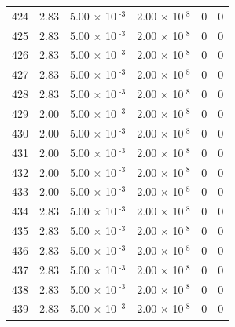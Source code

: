 \documentclass[a4paper,11pt]{article}
\begin{document}
\begin{center}
\begin{longtable}{|R{1.5cm}|R{2.4cm}|R{2.4cm}|R{2.4cm}|R{2.4cm}|R{2.4cm}|}
  424 &   2.83  &         5.00 $\times$ 10$^{\text{          -3}}$  &         2.00 $\times$ 10$^{\text{           8}}$  & 0  & 0 \\
  425 &   2.83  &         5.00 $\times$ 10$^{\text{          -3}}$  &         2.00 $\times$ 10$^{\text{           8}}$  & 0  & 0 \\
  426 &   2.83  &         5.00 $\times$ 10$^{\text{          -3}}$  &         2.00 $\times$ 10$^{\text{           8}}$  & 0  & 0 \\
  427 &   2.83  &         5.00 $\times$ 10$^{\text{          -3}}$  &         2.00 $\times$ 10$^{\text{           8}}$  & 0  & 0 \\
  428 &   2.83  &         5.00 $\times$ 10$^{\text{          -3}}$  &         2.00 $\times$ 10$^{\text{           8}}$  & 0  & 0 \\
  429 &   2.00  &         5.00 $\times$ 10$^{\text{          -3}}$  &         2.00 $\times$ 10$^{\text{           8}}$  & 0  & 0 \\
  430 &   2.00  &         5.00 $\times$ 10$^{\text{          -3}}$  &         2.00 $\times$ 10$^{\text{           8}}$  & 0  & 0 \\
  431 &   2.00  &         5.00 $\times$ 10$^{\text{          -3}}$  &         2.00 $\times$ 10$^{\text{           8}}$  & 0  & 0 \\
  432 &   2.00  &         5.00 $\times$ 10$^{\text{          -3}}$  &         2.00 $\times$ 10$^{\text{           8}}$  & 0  & 0 \\
  433 &   2.00  &         5.00 $\times$ 10$^{\text{          -3}}$  &         2.00 $\times$ 10$^{\text{           8}}$  & 0  & 0 \\
  434 &   2.83  &         5.00 $\times$ 10$^{\text{          -3}}$  &         2.00 $\times$ 10$^{\text{           8}}$  & 0  & 0 \\
  435 &   2.83  &         5.00 $\times$ 10$^{\text{          -3}}$  &         2.00 $\times$ 10$^{\text{           8}}$  & 0  & 0 \\
  436 &   2.83  &         5.00 $\times$ 10$^{\text{          -3}}$  &         2.00 $\times$ 10$^{\text{           8}}$  & 0  & 0 \\
  437 &   2.83  &         5.00 $\times$ 10$^{\text{          -3}}$  &         2.00 $\times$ 10$^{\text{           8}}$  & 0  & 0 \\
  438 &   2.83  &         5.00 $\times$ 10$^{\text{          -3}}$  &         2.00 $\times$ 10$^{\text{           8}}$  & 0  & 0 \\
  439 &   2.83  &         5.00 $\times$ 10$^{\text{          -3}}$  &         2.00 $\times$ 10$^{\text{           8}}$  & 0  & 0 \\

\end{longtable}
\end{center}
\end{document}
